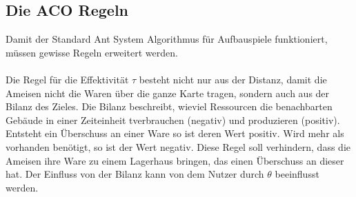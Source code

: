 \documentclass[12pt]{article}
\begin{document}
\subsection{Die ACO Regeln}\label{Regeln}
Damit der Standard Ant System Algorithmus für Aufbauspiele funktioniert, müssen gewisse Regeln erweitert werden. \\\\
Die Regel für die Effektivität $\tau$ besteht nicht nur aus der Distanz, damit die Ameisen nicht die Waren über die ganze Karte tragen, sondern auch aus der Bilanz des Zieles. Die Bilanz beschreibt, wieviel Ressourcen die benachbarten Gebäude in einer Zeiteinheit t\footnotemark[3] verbrauchen (negativ) und produzieren (positiv). Entsteht ein Überschuss an einer Ware so ist deren Wert positiv. Wird mehr als vorhanden benötigt, so ist der Wert negativ. Diese Regel soll verhindern, dass die Ameisen ihre Ware zu einem Lagerhaus bringen, das einen Überschuss an dieser hat. Der Einfluss von der Bilanz kann von dem Nutzer durch $\theta$ beeinflusst werden.
\end{document}
